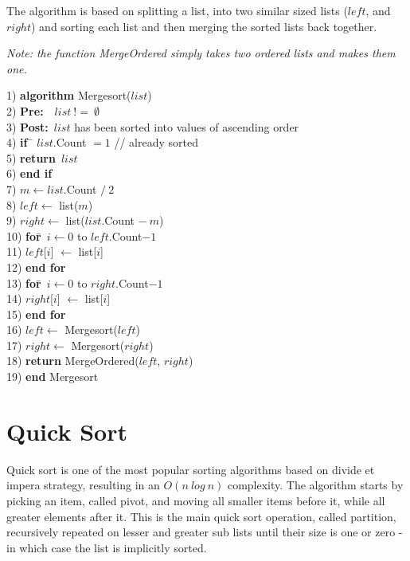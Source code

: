 The algorithm is based on splitting a list, into two similar sized lists ($left$, and $right$) and sorting each list and then merging the sorted lists back together.

\textit{Note: the function MergeOrdered simply takes two ordered lists and makes them one.}

\begin{tabbing}
1)  \textbf{alg}\= \textbf{orithm} Mergesort($list$) \\
2)  \> \textbf{Pre:}~~$list~!=~\emptyset$ \\
3)  \> \textbf{Post:}~$list$ has been sorted into values of ascending order \\
4)  \> \textbf{if}~\= $list$.Count $= 1$ // already sorted \\
5)  \> \> \textbf{return}~$list$ \\
6)  \> \textbf{end if} \\
7)  \> $m \leftarrow list$.Count $/~2$ \\
8)  \> $left \leftarrow$ list($m$) \\
9)  \> $right \leftarrow$ list($list$.Count $-~m$) \\
10) \> \textbf{for}\=~$i \leftarrow 0$ to $left$.Count$-1$ \\
11) \> \> $left$[$i$] $\leftarrow$ list[$i$] \\
12) \> \textbf{end for} \\
13) \> \textbf{for}\=~$i \leftarrow 0$ to $right$.Count$-1$ \\
14) \> \> $right$[$i$] $\leftarrow$ list[$i$] \\
15) \> \textbf{end for} \\
16) \> $left \leftarrow$ Mergesort($left$) \\
17) \> $right \leftarrow$ Mergesort($right$) \\
18) \> \textbf{return} MergeOrdered($left$, $right$) \\
19) \textbf{end} Mergesort \\
\end{tabbing}

\newpage
\section{Quick Sort} 
Quick sort is one of the most popular sorting algorithms based on divide et impera strategy, resulting in an $O(n~log~n)$ complexity. The algorithm starts by picking an item, called pivot, and moving all smaller items before it, while all greater elements after it. This is the main quick sort operation, called partition, recursively repeated on lesser and greater sub lists until their size  is one or zero - in which case the list is implicitly sorted.

